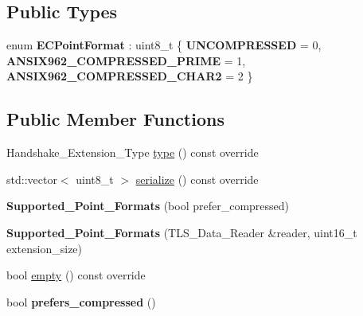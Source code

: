 \subsection*{Public Types}
\begin{DoxyCompactItemize}
\item 
\mbox{\label{class_botan_1_1_t_l_s_1_1_supported___point___formats_aff34df036ad6c7ca42d6ccc2ae3696cf}} 
enum {\bfseries E\+C\+Point\+Format} \+: uint8\+\_\+t \{ {\bfseries U\+N\+C\+O\+M\+P\+R\+E\+S\+S\+ED} = 0, 
{\bfseries A\+N\+S\+I\+X962\+\_\+\+C\+O\+M\+P\+R\+E\+S\+S\+E\+D\+\_\+\+P\+R\+I\+ME} = 1, 
{\bfseries A\+N\+S\+I\+X962\+\_\+\+C\+O\+M\+P\+R\+E\+S\+S\+E\+D\+\_\+\+C\+H\+A\+R2} = 2
 \}
\end{DoxyCompactItemize}
\subsection*{Public Member Functions}
\begin{DoxyCompactItemize}
\item 
Handshake\+\_\+\+Extension\+\_\+\+Type \hyperlink{class_botan_1_1_t_l_s_1_1_supported___point___formats_aeaf44021244451a57f6c257f13aa0a7d}{type} () const override
\item 
std\+::vector$<$ uint8\+\_\+t $>$ \hyperlink{class_botan_1_1_t_l_s_1_1_supported___point___formats_aa54041e3a08a83be4aeffa4b105a282c}{serialize} () const override
\item 
\mbox{\label{class_botan_1_1_t_l_s_1_1_supported___point___formats_a36f3871698365322c172f33c545d3c9c}} 
{\bfseries Supported\+\_\+\+Point\+\_\+\+Formats} (bool prefer\+\_\+compressed)
\item 
\mbox{\label{class_botan_1_1_t_l_s_1_1_supported___point___formats_ae30a84f0f9b06c0e8ad7b00f05611f08}} 
{\bfseries Supported\+\_\+\+Point\+\_\+\+Formats} (T\+L\+S\+\_\+\+Data\+\_\+\+Reader \&reader, uint16\+\_\+t extension\+\_\+size)
\item 
bool \hyperlink{class_botan_1_1_t_l_s_1_1_supported___point___formats_a66014f1fe0e75931f0c7a682aa9d9083}{empty} () const override
\item 
\mbox{\label{class_botan_1_1_t_l_s_1_1_supported___point___formats_ab42d3aafcab94b2b4c8a9c1d5ada920f}} 
bool {\bfseries prefers\+\_\+compressed} ()
\end{DoxyCompactItemize}
